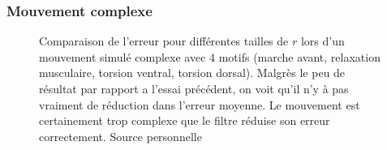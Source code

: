 
\subsubsection{Mouvement complexe} %
\label{ssub:Mouvement complexe}

\begin{figure}[h]
   \begin{center}
   \end{center}
   \caption[Comparaison de l'erreur pour différents $r$ lors d'un mouvement 
   simulé complexe]{Comparaison de l'erreur pour différentes tailles de $r$ lors
   d'un mouvement simulé complexe avec 4 motifs (marche avant, relaxation musculaire,
   torsion ventral, torsion dorsal). Malgrès le peu de résultat par rapport a l'essai
   précédent, on voit qu'il n'y à pas vraiment de réduction dans l'erreur moyenne. Le
   mouvement est certainement trop complexe que le filtre réduise son erreur correctement.
   Source personnelle}
   \label{fig:comparaison_r_mouvement_complexe}
\end{figure}

\begin{figure}[h]
   \begin{center}
   \end{center}
   \caption[]{}
   \label{fig:comparaison_r_mouvement_complexe_2}
\end{figure}




